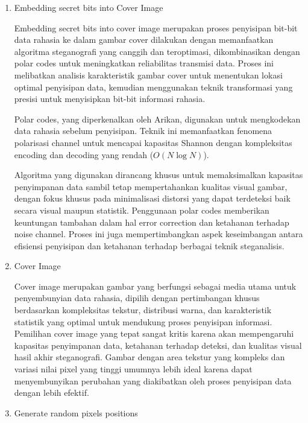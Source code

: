 \documentclass{ittelkom}
\begin{document}
\begin{enumerate}
    \item Embedding secret bits into Cover Image

          Embedding secret bits into cover image merupakan proses penyisipan bit-bit data
          rahasia ke dalam gambar cover dilakukan dengan memanfaatkan algoritma
          steganografi yang canggih dan teroptimasi, dikombinasikan dengan polar codes
          untuk meningkatkan reliabilitas transmisi data. Proses ini melibatkan analisis
          karakteristik gambar cover untuk menentukan lokasi optimal penyisipan data,
          kemudian menggunakan teknik transformasi yang presisi untuk menyisipkan bit-bit
          informasi rahasia.

          Polar codes, yang diperkenalkan oleh Arikan, digunakan untuk mengkodekan data
          rahasia sebelum penyisipan. Teknik ini memanfaatkan fenomena polarisasi channel
          untuk mencapai kapasitas Shannon dengan kompleksitas encoding dan decoding yang
          rendah ($O(N \log N)$).

          Algoritma yang digunakan dirancang khusus untuk memaksimalkan kapasitas
          penyimpanan data sambil tetap mempertahankan kualitas visual gambar, dengan
          fokus khusus pada minimalisasi distorsi yang dapat terdeteksi baik secara
          visual maupun statistik. Penggunaan polar codes memberikan keuntungan tambahan
          dalam hal error correction dan ketahanan terhadap noise channel. Proses ini
          juga mempertimbangkan aspek keseimbangan antara efisiensi penyisipan dan
          ketahanan terhadap berbagai teknik steganalisis.

    \item Cover Image

          Cover image merupakan gambar yang berfungsi sebagai media utama untuk
          penyembunyian data rahasia, dipilih dengan pertimbangan khusus berdasarkan
          kompleksitas tekstur, distribusi warna, dan karakteristik statistik yang
          optimal untuk mendukung proses penyisipan informasi. Pemilihan cover image yang
          tepat sangat kritis karena akan mempengaruhi kapasitas penyimpanan data,
          ketahanan terhadap deteksi, dan kualitas visual hasil akhir steganografi.
          Gambar dengan area tekstur yang kompleks dan variasi nilai pixel yang tinggi
          umumnya lebih ideal karena dapat menyembunyikan perubahan yang diakibatkan oleh
          proses penyisipan data dengan lebih efektif.

    \item Generate random pixels positions


\end{enumerate}
\end{document}
